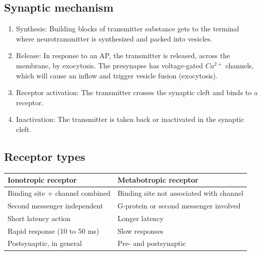 \documentclass[a4paper, 12pt]{article}
\begin{document}
\subsection{Synaptic mechanism}
\begin{enumerate}
	\item Synthesis: Building blocks of transmitter substance gets to the terminal where neurotransmitter is synthesized and packed into vesicles.
	\item Release: In response to an AP, the transmitter is released, across the membrane, by exocytosis. The presynapse has voltage-gated $Ca^{2+}$ channels, which will cause an inflow and trigger vesicle fusion (exocytosis).
	\item Receptor activation: The transmitter crosses the synaptic cleft and binds to a receptor.
	\item Inactivation: The transmitter is taken back or inactivated in the synaptic cleft.
\end{enumerate}

\subsection{Receptor types}
\begin{tabular}{|l|l|}
	\hline
	\textbf{Ionotropic receptor} & \textbf{Metabotropic receptor}\\\hline
	Binding site + channel combined & Binding site not associated with channel\\\hline
	Second messenger independent & G-protein or second messenger involved\\\hline
	Short latency action & Longer latency\\\hline
	Rapid response (10 to 50 ms) & Slow responses\\\hline
	Postsynaptic, in general & Pre- and postsynaptic\\\hline
\end{tabular}
\end{document}
